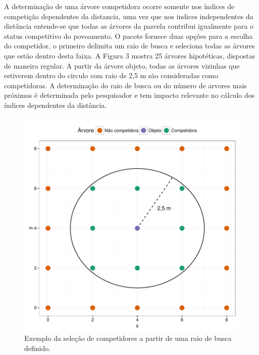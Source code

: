 \documentclass[article]{jss}
\begin{document}
A determinação de uma árvore competidora ocorre somente nos índices de
competição dependentes da distancia, uma vez que nos indices
independentes da distância entende-se que todas as árvores da parcela
contribui igualmente para o status competitivo do povoamento. O pacote
fornece duas opções para a escolha do competidor, o primeiro delimita um
raio de busca e seleciona todas as árvores que estão dentro desta faixa.
A Figura 3 mostra 25 árvores hipotéticas, dispostas de maneira regular.
A partir da árvore objeto, todas as árvores vizinhas que estiverem
dentro do circulo com raio de 2,5 m são consideradas como competidoras.
A determinação do raio de busca ou do número de arvores mais próximas é
determinada pelo pesquisador e tem impacto relevante no cálculo dos
índices dependentes da distância.

\begin{CodeChunk}
\begin{figure}

{\centering \includegraphics{comp3-paper_files/figure-latex/ex_comp-1} 

}

\caption[Exemplo da seleção de competidores a partir de uma raio de busca definido]{Exemplo da seleção de competidores a partir de uma raio de busca definido.}\label{fig:ex_comp}
\end{figure}
\end{CodeChunk}
\end{document}
